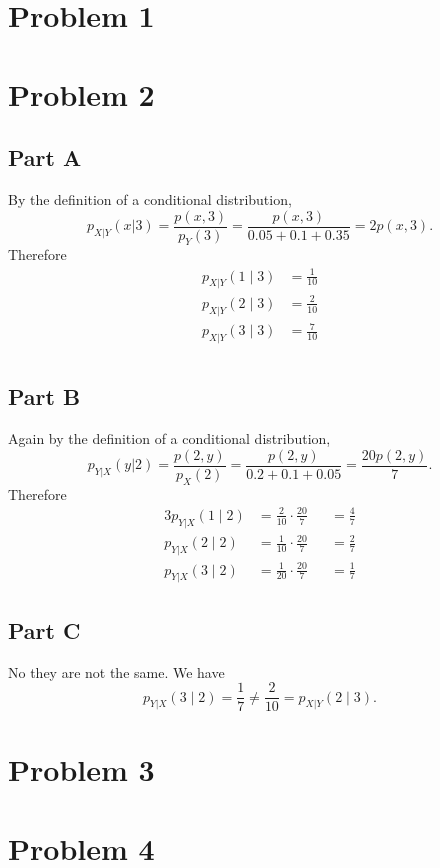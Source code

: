 \documentclass{eeleyes}
\begin{document}
\section*{Problem 1}

\section*{Problem 2}
\subsection*{Part A}
By the definition of a conditional distribution,
\[
    p_{X | Y}(x | 3) = \frac{p(x,3)}{p_{Y}(3)} = \frac{p(x,3)}{0.05 + 0.1 + 0.35} = 2 p(x,3)
.\]
Therefore
\begin{align*}
    p_{X | Y}(1 \mid 3) &= \frac{1}{10} \\
    p_{X | Y}(2 \mid 3) &= \frac{2}{10} \\
    p_{X | Y}(3 \mid 3) &= \frac{7}{10} \\
\end{align*}

\subsection*{Part B}
Again by the definition of a conditional distribution,
\[
    p_{Y | X}(y | 2) = \frac{p(2,y)}{p_{X}(2)} = \frac{p(2,y)}{0.2 + 0.1 + 0.05} = \frac{20 p(2,y)}{7}
.\]
Therefore
\begin{alignat*}{3}
    p_{Y | X}(1 \mid 2) &= \frac{2}{10} \cdot \frac{20}{7} &&= \frac{4}{7} \\
    p_{Y | X}(2 \mid 2) &= \frac{1}{10} \cdot \frac{20}{7} &&= \frac{2}{7} \\
    p_{Y | X}(3 \mid 2) &= \frac{1}{20} \cdot \frac{20}{7} &&= \frac{1}{7}
\end{alignat*}

\subsection*{Part C}
No they are not the same. We have
\[
    p_{Y|X}(3 \mid 2) = \frac{1}{7} \neq \frac{2}{10} = p_{X | Y}(2 \mid 3)
.\]

\section*{Problem 3}
\section*{Problem 4}
\end{document}
